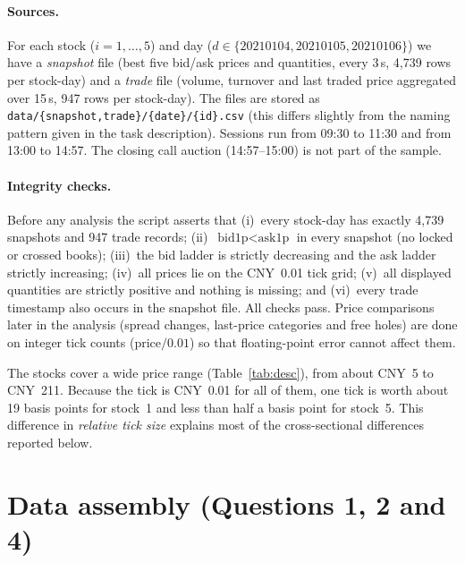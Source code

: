 \documentclass[11pt,a4paper]{article}
\newcommand{\code}[1]{\texttt{#1}}
\begin{document}
\paragraph{Sources.} For each stock ($i=1,\dots,5$) and day ($d\in\{20210104,20210105,20210106\}$) we
have a \emph{snapshot} file (best five bid/ask prices and quantities, every 3\,s, 4{,}739 rows per
stock-day) and a \emph{trade} file (volume, turnover and last traded price aggregated over 15\,s,
947 rows per stock-day). The files are stored as \code{data/\{snapshot,trade\}/\{date\}/\{id\}.csv}
(this differs slightly from the naming pattern given in the task description). Sessions run from
09:30 to 11:30 and from 13:00 to 14:57. The closing call auction (14:57--15:00) is not part of the
sample.

\paragraph{Integrity checks.} Before any analysis the script asserts that (i)~every stock-day has
exactly 4{,}739 snapshots and 947 trade records; (ii)~$\text{bid1p}<\text{ask1p}$ in every snapshot
(no locked or crossed books); (iii)~the bid ladder is strictly decreasing and the ask ladder strictly
increasing; (iv)~all prices lie on the CNY~0.01 tick grid; (v)~all displayed quantities are strictly
positive and nothing is missing; and (vi)~every trade timestamp also occurs in the snapshot
file. All checks pass. Price comparisons later in the analysis (spread changes, last-price
categories and free holes) are done on integer tick counts ($\text{price}/0.01$) so that
floating-point error cannot affect them.

\begin{table}[H]
\centering\small
\caption{Price level of the five stocks (mid-quote, CNY, all three days).}
\label{tab:desc}

\end{table}

The stocks cover a wide price range (Table~\ref{tab:desc}), from about CNY~5 to CNY~211. Because
the tick is CNY~0.01 for all of them, one tick is worth about 19 basis points for stock~1 and less
than half a basis point for stock~5. This difference in \emph{relative tick size}
\citep{harris1994,dayri2015} explains most of the cross-sectional differences reported below.

\section{Data assembly (Questions 1, 2 and 4)}\label{sec:assembly}
\end{document}
